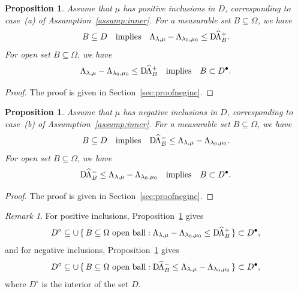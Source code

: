 \documentclass[reqno]{amsart}
\numberwithin{equation}{section}
\numberwithin{figure}{section}
\numberwithin{table}{section}
\newcommand{\DhLambda}{\textup{D}\mkern-1.5mu \widehat{\Lambda}}
\theoremstyle{definition}
\theoremstyle{plain}
\newtheorem{prop}[thm]{Proposition}
\theoremstyle{definition}
\theoremstyle{remark}
\newtheorem{rem}[thm]{Remark}
\numberwithin{equation}{section}
\begin{document}
\begin{prop} \label{prop:posinc}
	Assume that $\mu$ has \emph{positive inclusions} in $D$, corresponding to case~(a) of Assumption~\ref{assump:inner}. For a measurable set $B \subseteq \Omega$, we have 
	\begin{equation*}
		B\subseteq D \quad \text{implies} \quad \Lambda_{\lambda,\mu}-\Lambda_{\lambda_0,\mu_0} \leq \DhLambda^+_B.
	\end{equation*}
	For open set $B \subseteq \Omega$, we have
	\begin{equation*}
		\Lambda_{\lambda,\mu} - \Lambda_{\lambda_0,\mu_0} \leq \DhLambda^+_B \quad \text{implies} \quad B\subset D^\bullet.
	\end{equation*}
\end{prop}
%
\begin{proof}
	The proof is given in Section~\ref{sec:proofneginc}.
\end{proof}
%
\begin{prop} \label{prop:neginc}
	Assume that $\mu$ has \emph{negative inclusions} in $D$, corresponding to case~(b) of Assumption~\ref{assump:inner}. For a measurable set $B \subseteq \Omega$, we have 
	\begin{equation*}
		B\subseteq D \quad \text{implies} \quad \DhLambda^-_B \leq \Lambda_{\lambda,\mu}-\Lambda_{\lambda_0,\mu_0}.
	\end{equation*}
	For open set $B \subseteq \Omega$, we have
	\begin{equation*}
		\DhLambda^-_B \leq \Lambda_{\lambda,\mu}-\Lambda_{\lambda_0,\mu_0} \quad \text{implies} \quad B\subset D^\bullet.
	\end{equation*}
\end{prop}
%
\begin{proof}
	The proof is given in Section~\ref{sec:proofneginc}.
\end{proof}
%
\begin{rem}
	For positive inclusions, Proposition~\ref{prop:posinc} gives
	\begin{equation*}
		D^\circ \subseteq \cup\,\{\, B\subseteq\Omega \text{ open ball} : \Lambda_{\lambda,\mu} - \Lambda_{\lambda_0,\mu_0} \leq \DhLambda^+_B \,\} \subset D^\bullet,
	\end{equation*}
	and for negative inclusions, Proposition~\ref{prop:neginc} gives
	\begin{equation*}
		D^\circ \subseteq \cup\,\{\, B\subseteq\Omega \text{ open ball} : \DhLambda^-_B \leq \Lambda_{\lambda,\mu}-\Lambda_{\lambda_0,\mu_0} \,\} \subset D^\bullet,
	\end{equation*}
	where $D^\circ$ is the interior of the set $D$.
\end{rem}
\end{document}
